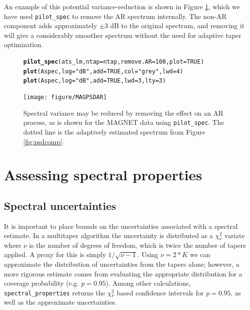 \documentclass{article}\usepackage{graphicx, color}
\makeatletter
\newcommand{\hlfunctioncall}[1]{\textcolor[rgb]{0.501960784313725,0,0.329411764705882}{\textbf{#1}}}%
\newcommand{\hlstring}[1]{\textcolor[rgb]{0.6,0.6,1}{#1}}%
\newenvironment{kframe}{%
 \def\at@end@of@kframe{}%
 \ifinner\ifhmode%
  \def\at@end@of@kframe{\end{minipage}}%
  \begin{minipage}{\columnwidth}%
 \fi\fi%
 \def\FrameCommand##1{\hskip\@totalleftmargin \hskip-\fboxsep
 \colorbox{shadecolor}{##1}\hskip-\fboxsep
     \hskip-\linewidth \hskip-\@totalleftmargin \hskip\columnwidth}%
 \MakeFramed {\advance\hsize-\width
   \@totalleftmargin\z@ \linewidth\hsize
   \@setminipage}}%
 {\par\unskip\endMakeFramed%
 \at@end@of@kframe}
\newenvironment{knitrout}{}{} %
\newcommand{\Rcmd}[1]{\texttt{#1}}
\makeatother
\begin{document}
An example of this potential variance-reduction is shown in Figure \ref{fig:arspecvar},
which we have used \Rcmd{pilot\_spec} to remove the AR spectrum
internally.  The non-AR component adds approximately $\pm 3$ dB to the original spectrum,
and removing it will give a considerably smoother spectrum without the 
need for adaptive 
taper optimization.

\begin{figure}[htb!]
\begin{center}
\begin{knitrout}
\color{fgcolor}\begin{kframe}
\begin{alltt}
\hlfunctioncall{pilot_spec}(ats_lm, ntap = ntap, remove.AR = 100, plot = TRUE)
\hlfunctioncall{plot}(Aspec, log = \hlstring{"dB"}, add = TRUE, col = \hlstring{"grey"}, lwd = 4)
\hlfunctioncall{plot}(Aspec, log = \hlstring{"dB"}, add = TRUE, lwd = 3, lty = 3)
\end{alltt}
\end{kframe}
\texttt{[image: figure/MAGPSDAR]} 

\end{knitrout}

\caption{Spectral variance may be reduced by removing the effect
on an AR process, as is shown for the MAGNET data using
\Rcmd{pilot\_spec}.  The dotted line is the adaptively estimated spectrum
from Figure \ref{fig:psdcomp}.}
\label{fig:arspecvar}
\end{center}
\end{figure}

\section{Assessing spectral properties}
\subsection{Spectral uncertainties}
It is important to place bounds on the uncertainties associated
with a spectral estimate.
In a multitaper algorithm the uncertainty is distributed as
a $\chi{}_{\nu}^2$ variate where $\nu$ is
the number of degrees of freedom, which is twice the
number of tapers applied.
A proxy for this is simply $1/\sqrt{\nu - 1}$.
Using $\nu = 2*K$ we can approximate the distribution
of uncertainties from the tapers alone; however, a more
rigorous estimate comes from evaluating the appropriate 
distribution  for a coverage probability (e.g. $p=0.95$).
Among other calculations, \Rcmd{spectral\_properties} returns the 
$\chi{}_{\nu}^2$ based confidence intervals for $p=0.95$, as well as the
approximate uncertainties.  
\end{document}
